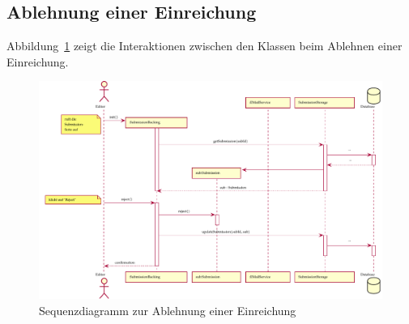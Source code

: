 \subsection{Ablehnung einer Einreichung}\label{subsec:sequenz-ablehnung}

Abbildung~\ref{fig:upload-review-sequence} zeigt die Interaktionen zwischen den Klassen beim Ablehnen einer Einreichung.

\begin{figure}
    \centering
    \includegraphics[width=\textwidth]{graphics/reject_submission}
    \caption{Sequenzdiagramm zur Ablehnung einer Einreichung}
    \label{fig:upload-review-sequence}
\end{figure}
